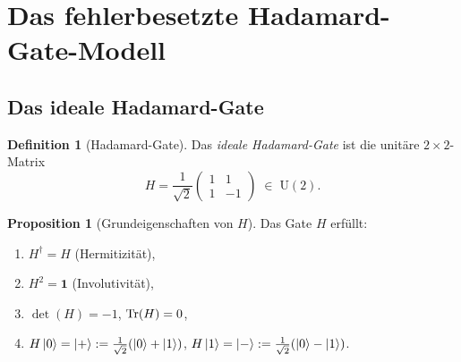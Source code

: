 ﻿\documentclass[11pt,a4paper]{article}
\theoremstyle{definition}
\newtheorem{proposition}[theorem]{Proposition}
\newtheorem{definition}[theorem]{Definition}
\begin{document}
\section{Das fehlerbesetzte Hadamard-Gate-Modell}
\label{sec:model}

\subsection{Das ideale Hadamard-Gate}
\label{subsec:ideal}

\begin{definition}[Hadamard-Gate]
  Das \emph{ideale Hadamard-Gate} ist die unitäre $2\times2$-Matrix
  \begin{equation}
    H = \frac{1}{\sqrt{2}} \begin{pmatrix} 1 & 1 \\ 1 & -1 \end{pmatrix}
    \;\in\; \mathrm{U}(2).
    \label{eq:H_def}
  \end{equation}
\end{definition}

\begin{proposition}[Grundeigenschaften von $H$]
\label{prop:H_props}
  Das Gate $H$ erfüllt:
  \begin{enumerate}[label=(\alph*)]
    \item $H^\dagger = H$ (Hermitizität),
    \item $H^2 = \mathbf{1}$ (Involutivität),
    \item $\det(H) = -1$, $\Tr(H) = 0$,
    \item $H\ket{0} = \ket{+} := \tfrac{1}{\sqrt{2}}(\ket{0}+\ket{1})$,
          $H\ket{1} = \ket{-} := \tfrac{1}{\sqrt{2}}(\ket{0}-\ket{1})$.
  \end{enumerate}
\end{proposition}
\end{document}

